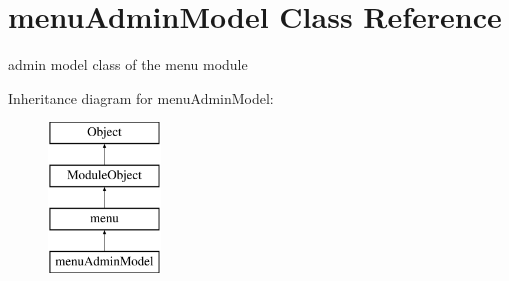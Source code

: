 \hypertarget{classmenuAdminModel}{\section{menu\-Admin\-Model Class Reference}
\label{classmenuAdminModel}
}


admin model class of the menu module  


Inheritance diagram for menu\-Admin\-Model\-:\begin{figure}[H]
\begin{center}
\leavevmode
\includegraphics[height=4.000000cm]{classmenuAdminModel}
\end{center}
\end{figure}
